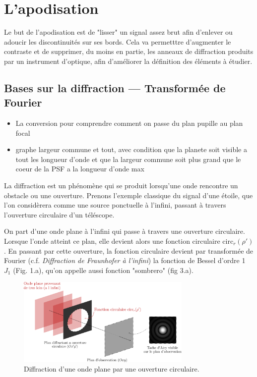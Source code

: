 \section{\centering L'apodisation}

Le but de l'apodisation est de "lisser" un signal assez brut afin d'enlever ou adoucir les discontinuités sur ses bords. 
Cela va permetttre d'augmenter le contraste et de supprimer, du moins en partie, les anneaux de diffraction produits par un instrument d'optique, afin d'améliorer la définition des éléments à étudier.

\subsection{Bases sur la diffraction — Transformée de Fourier}

\begin{itemize}
\item La conversion pour comprendre comment on passe du plan pupille au plan focal
    
    \item graphe largeur commune et tout, avec condition que la planete soit visible a tout les longueur d’onde et que la largeur commune soit plus grand que le coeur de la PSF a la longueur d’onde max 
\end{itemize}

La diffraction est un phénomène qui se produit lorsqu'une onde rencontre un obstacle ou une ouverture. Prenons l'exemple classique du signal d'une étoile, que l'on considèrera comme une source ponctuelle à l'infini, passant à travers l'ouverture circulaire d'un téléscope. 

On part d'une onde plane à l'infini qui passe à travers une ouverture circulaire. Lorsque l'onde atteint ce plan, elle devient alors une fonction circulaire $\text{circ}_r(\rho')$.
En passant par cette ouverture, la fonction circulaire devient par transformée de Fourier (c.f. \emph{Diffraction de Fraunhofer à l'infini}) la fonction de Bessel d'ordre 1 $J_1$ (Fig. 1.a), qu'on appelle aussi fonction "sombrero" (fig 3.a).

\begin{figure}[htbp]
    \centering
    \includegraphics[width=0.75\textwidth]{figures/diff.png}
    \caption{Diffraction d'une onde plane par une ouverture circulaire.}
\end{figure}

